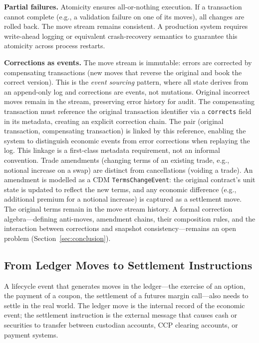 \documentclass[11pt,a4paper]{article}
\begin{document}
\noindent\textbf{Partial failures.} Atomicity ensures all-or-nothing execution. If a transaction cannot complete (e.g., a validation failure on one of its moves), all changes are rolled back. The move stream remains consistent. A production system requires write-ahead logging or equivalent crash-recovery semantics to guarantee this atomicity across process restarts.

\noindent\textbf{Corrections as events.} The move stream is immutable: errors are corrected by compensating transactions (new moves that reverse the original and book the correct version). This is the \textit{event sourcing} pattern, where all state derives from an append-only log and corrections are events, not mutations. Original incorrect moves remain in the stream, preserving error history for audit. The compensating transaction must reference the original transaction identifier via a \texttt{corrects} field in its metadata, creating an explicit correction chain. The pair (original transaction, compensating transaction) is linked by this reference, enabling the system to distinguish economic events from error corrections when replaying the log. This linkage is a first-class metadata requirement, not an informal convention. Trade amendments (changing terms of an existing trade, e.g., notional increase on a swap) are distinct from cancellations (voiding a trade). An amendment is modelled as a CDM \texttt{TermsChangeEvent}: the original contract's unit state is updated to reflect the new terms, and any economic difference (e.g., additional premium for a notional increase) is captured as a settlement move. The original terms remain in the move stream history. A formal correction algebra---defining anti-moves, amendment chains, their composition rules, and the interaction between corrections and snapshot consistency---remains an open problem (Section~\ref{sec:conclusion}).

\subsection{From Ledger Moves to Settlement Instructions}

A lifecycle event that generates moves in the ledger---the exercise of an option, the payment of a coupon, the settlement of a futures margin call---also needs to settle in the real world. The ledger move is the internal record of the economic event; the settlement instruction is the external message that causes cash or securities to transfer between custodian accounts, CCP clearing accounts, or payment systems.
\end{document}
